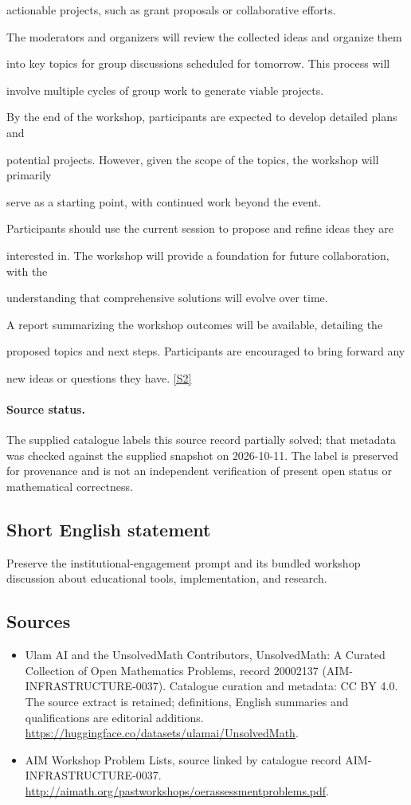 \documentclass[11pt]{article}
\begin{document}
actionable projects, such as grant proposals or collaborative efforts.

The moderators and organizers will review the collected ideas and organize them

into key topics for group discussions scheduled for tomorrow. This process will

involve multiple cycles of group work to generate viable projects.

By the end of the workshop, participants are expected to develop detailed plans and

potential projects. However, given the scope of the topics, the workshop will primarily

serve as a starting point, with continued work beyond the event.

Participants should use the current session to propose and refine ideas they are

interested in. The workshop will provide a foundation for future collaboration, with the

understanding that comprehensive solutions will evolve over time.

A report summarizing the workshop outcomes will be available, detailing the

proposed topics and next steps. Participants are encouraged to bring forward any

new ideas or questions they have. \href{http://aimath.org/pastworkshops/oerassessmentproblems.pdf}{[S2]}
\paragraph{Source status.}
The supplied catalogue labels this source record partially solved; that metadata was checked against the supplied snapshot on 2026-10-11. The label is preserved for provenance and is not an independent verification of present open status or mathematical correctness.
\subsection{Short English statement}
Preserve the institutional-engagement prompt and its bundled workshop discussion about educational tools, implementation, and research.
\subsection{Sources}
\begin{itemize}
\item[S1] Ulam AI and the UnsolvedMath Contributors, UnsolvedMath: A Curated Collection of Open Mathematics Problems, record 20002137 (AIM-INFRASTRUCTURE-0037). Catalogue curation and metadata: CC BY 4.0. The source extract is retained; definitions, English summaries and qualifications are editorial additions.
\url{https://huggingface.co/datasets/ulamai/UnsolvedMath}.
\item[S2] AIM Workshop Problem Lists, source linked by catalogue record AIM-INFRASTRUCTURE-0037.
\url{http://aimath.org/pastworkshops/oerassessmentproblems.pdf}.
\end{itemize}
\end{document}
